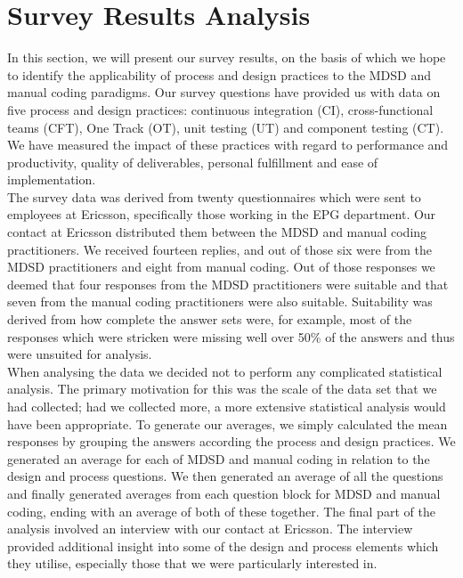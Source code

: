 \documentclass[final_report_innit.tex]{subfiles}
\begin{document}
\section{Survey Results Analysis}

In this section, we will present our survey results, on the basis of which we hope to identify the applicability of process and design practices to the MDSD and manual coding paradigms. Our survey questions have provided us with data on five process and design practices: continuous integration (CI), cross-functional teams (CFT), One Track (OT), unit testing (UT) and component testing (CT). We have measured the impact of these practices with regard to performance and productivity, quality of deliverables, personal fulfillment and ease of implementation.
\\

The survey data was derived from twenty questionnaires which were sent to employees at Ericsson, specifically those working in the EPG department. Our contact at Ericsson distributed them between the MDSD and manual coding practitioners. We received fourteen replies, and out of those six were from the MDSD practitioners and eight from manual coding. Out of those responses we deemed that four responses from the MDSD practitioners were suitable and that seven from the manual coding practitioners were also suitable. Suitability was derived from how complete the answer sets were, for example, most of the responses which were stricken were missing well over 50\% of the answers and thus were unsuited for analysis.
\\

When analysing the data we decided not to perform any complicated statistical analysis. The primary motivation for this was the scale of the data set that we had collected; had we collected more, a more extensive statistical analysis would have been appropriate. To generate our averages, we simply calculated the mean responses by grouping the answers according the process and design practices. We generated an average for each of MDSD and manual coding in relation to the design and process questions. We then generated an average of all the questions and finally generated averages from each question block for MDSD and manual coding, ending with an average of both of these together. The final part of the analysis involved an interview with our contact at Ericsson. The interview provided additional insight into some of the design and process elements which they utilise, especially those that we were particularly interested in.
\\
\end{document}
